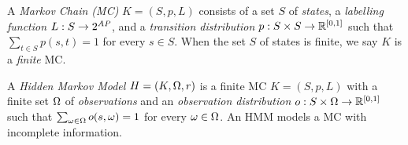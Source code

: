 
A \emph{Markov Chain (MC)} $K = (S, p, L)$ consists of a set $S$ of
\emph{states}, a \emph{labelling function} $L : S \rightarrow
2^{\mathit{AP}}$, and a \emph{transition distribution} $p : S \times S
\rightarrow \mathbb{R}^{[0, 1]}$ such that $\sum_{t \in S} p (s, t) = 1$ for every
$s \in S$. When the set $S$ of states is finite, we say $K$ is a
\emph{finite} MC. 

A \emph{Hidden Markov Model} $H = (K, \Omega, r)$ is a finite MC $K =
(S, p, L)$ with a finite set $\Omega$ of \emph{observations} and an
\emph{observation distribution} $o : S \times \Omega \rightarrow \mathbb{R}^{[0, 1]}$
such that $\sum_{\omega \in \Omega} o (s, \omega) = 1$ for every $\omega \in
\Omega$. An HMM models a MC with incomplete information. 

